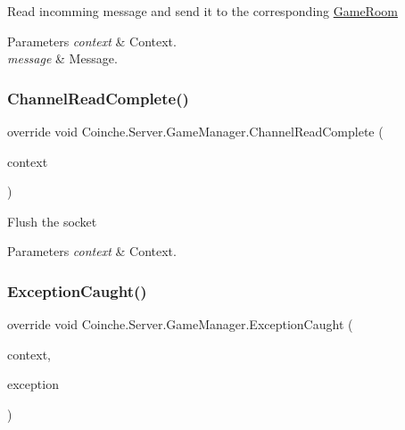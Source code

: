 Read incomming message and send it to the corresponding \hyperlink{class_coinche_1_1_server_1_1_game_room}{Game\+Room} 


\begin{DoxyParams}{Parameters}
{\em context} & Context.\\
\hline
{\em message} & Message.\\
\hline
\end{DoxyParams}
\mbox{\label{class_coinche_1_1_server_1_1_game_manager_a6f0b2a2abd6f793b8d45dcd8f41819a0}} 
\subsubsection{\texorpdfstring{Channel\+Read\+Complete()}{ChannelReadComplete()}}
{\footnotesize\ttfamily override void Coinche.\+Server.\+Game\+Manager.\+Channel\+Read\+Complete (\begin{DoxyParamCaption}\item[{I\+Channel\+Handler\+Context}]{context }\end{DoxyParamCaption})}



Flush the socket 


\begin{DoxyParams}{Parameters}
{\em context} & Context.\\
\hline
\end{DoxyParams}
\mbox{\label{class_coinche_1_1_server_1_1_game_manager_a87a33c57dcce28d543de561f7ab4134b}} 
\subsubsection{\texorpdfstring{Exception\+Caught()}{ExceptionCaught()}}
{\footnotesize\ttfamily override void Coinche.\+Server.\+Game\+Manager.\+Exception\+Caught (\begin{DoxyParamCaption}\item[{I\+Channel\+Handler\+Context}]{context,  }\item[{Exception}]{exception }\end{DoxyParamCaption})\hspace{0.3cm}{\ttfamily [inline]}}



